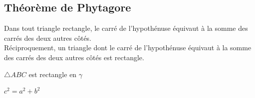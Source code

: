 \documentclass[a4paper,12pt]{article}
\begin{document}
\pagebreak
\subsection{Théorème de Phytagore}
\begin{theorem}
Dans tout triangle rectangle, le carré de l'hypothénuse équivaut à la somme des carrés des deux autres côtés.\\
Réciproquement, un triangle dont le carré de l'hypothénuse équivaut à la somme des carrés des deux autres côtés est rectangle.
\end{theorem}




\begin{hyp}
$\triangle ABC$ est rectangle en $\gamma$
\end{hyp}

\begin{concl}
$c^2 = a^2 + b^2$
\end{concl}
\end{document}
